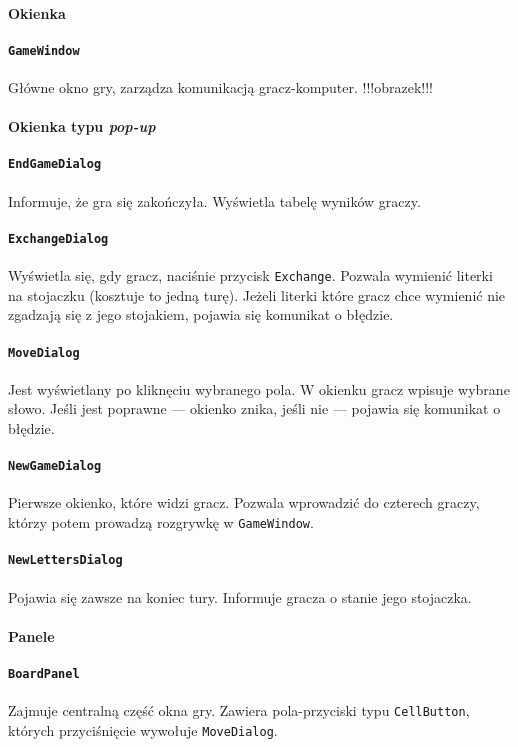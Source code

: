 \documentclass[a4paper]{article}
\begin{document}
\paragraph{Okienka}
\paragraph{\texttt{GameWindow}} Główne okno gry, zarządza komunikacją gracz-komputer.
!!!obrazek!!!
\paragraph{Okienka typu \textit{pop-up}}
\paragraph{\texttt{EndGameDialog}} Informuje, że gra się zakończyła. Wyświetla tabelę wyników graczy.
\paragraph{\texttt{ExchangeDialog}} Wyświetla się, gdy gracz, naciśnie przycisk \texttt{Exchange}. Pozwala wymienić literki na stojaczku (kosztuje to jedną turę).
Jeżeli literki które gracz chce wymienić nie zgadzają się z jego stojakiem, pojawia się komunikat o błędzie.
\paragraph{\texttt{MoveDialog}} Jest wyświetlany po kliknęciu wybranego pola. W okienku gracz wpisuje wybrane słowo.
Jeśli jest poprawne --- okienko znika, jeśli nie --- pojawia się komunikat o błędzie.
\paragraph{\texttt{NewGameDialog}} Pierwsze okienko, które widzi gracz.
Pozwala wprowadzić do czterech graczy, którzy potem prowadzą rozgrywkę w \texttt{GameWindow}.
\paragraph{\texttt{NewLettersDialog}} Pojawia się zawsze na koniec tury. Informuje gracza o stanie jego stojaczka.
\paragraph{Panele}
\paragraph{\texttt{BoardPanel}} Zajmuje centralną część okna gry. Zawiera pola-przyciski typu \texttt{CellButton}, których przyciśnięcie wywołuje \texttt{MoveDialog}.
\end{document}
